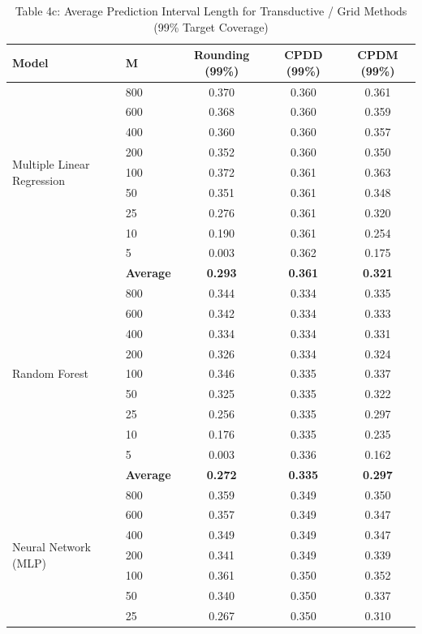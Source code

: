 \documentclass[11pt,a4paper]{article}
\begin{document}
\begin{table}[H]
\centering
\caption{Table 4c: Average Prediction Interval Length for Transductive / Grid Methods (99\% Target Coverage)}
\label{tab:mvp_tab4c}
\scriptsize
\begin{tabular}{llccc}
\toprule
Model & M & Rounding (99\%) & CPDD (99\%) & CPDM (99\%) \\
\midrule
\multirow{9}{*}{Multiple Linear Regression}
 & 800 & 0.370 & 0.360 & 0.361 \\
 & 600 & 0.368 & 0.360 & 0.359 \\
 & 400 & 0.360 & 0.360 & 0.357 \\
 & 200 & 0.352 & 0.360 & 0.350 \\
 & 100 & 0.372 & 0.361 & 0.363 \\
 & 50  & 0.351 & 0.361 & 0.348 \\
 & 25  & 0.276 & 0.361 & 0.320 \\
 & 10  & 0.190 & 0.361 & 0.254 \\
 & 5   & 0.003 & 0.362 & 0.175 \\
 & \textbf{Average} & \textbf{0.293} & \textbf{0.361} & \textbf{0.321} \\
\midrule
\multirow{9}{*}{Random Forest}
 & 800 & 0.344 & 0.334 & 0.335 \\
 & 600 & 0.342 & 0.334 & 0.333 \\
 & 400 & 0.334 & 0.334 & 0.331 \\
 & 200 & 0.326 & 0.334 & 0.324 \\
 & 100 & 0.346 & 0.335 & 0.337 \\
 & 50  & 0.325 & 0.335 & 0.322 \\
 & 25  & 0.256 & 0.335 & 0.297 \\
 & 10  & 0.176 & 0.335 & 0.235 \\
 & 5   & 0.003 & 0.336 & 0.162 \\
 & \textbf{Average} & \textbf{0.272} & \textbf{0.335} & \textbf{0.297} \\
\midrule
\multirow{9}{*}{Neural Network (MLP)}
 & 800 & 0.359 & 0.349 & 0.350 \\
 & 600 & 0.357 & 0.349 & 0.347 \\
 & 400 & 0.349 & 0.349 & 0.347 \\
 & 200 & 0.341 & 0.349 & 0.339 \\
 & 100 & 0.361 & 0.350 & 0.352 \\
 & 50  & 0.340 & 0.350 & 0.337 \\
 & 25  & 0.267 & 0.350 & 0.310 \\

\end{tabular}
\end{table}
\end{document}
